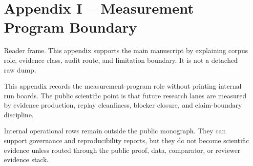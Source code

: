 \section{Appendix I -- Measurement Program Boundary}
Reader frame. This appendix supports the main manuscript by explaining corpus role, evidence class, audit route, and limitation boundary. It is not a detached raw dump.


\label{sec:oc-core-1-3-institute-run-measurement-program-summary}

This appendix records the measurement-program role without printing internal run boards. The public scientific point is that future research lanes are measured by evidence production, replay cleanliness, blocker closure, and claim-boundary discipline.


Internal operational rows remain outside the public monograph. They can support governance and reproducibility reports, but they do not become scientific evidence unless routed through the public proof, data, comparator, or reviewer evidence stack.
